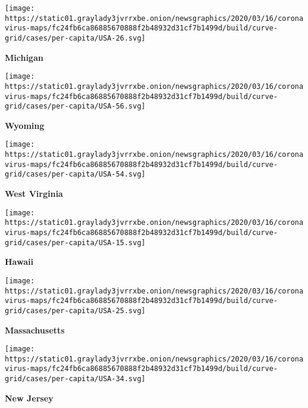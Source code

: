 \href{https://www.nytimes3xbfgragh.onion/interactive/2020/us/michigan-coronavirus-cases.html}{}

\texttt{[image: https://static01.graylady3jvrrxbe.onion/newsgraphics/2020/03/16/coronavirus-maps/fc24fb6ca86885670888f2b48932d31cf7b1499d/build/curve-grid/cases/per-capita/USA-26.svg]}

\textbf{Michigan}

\href{https://www.nytimes3xbfgragh.onion/interactive/2020/us/wyoming-coronavirus-cases.html}{}

\texttt{[image: https://static01.graylady3jvrrxbe.onion/newsgraphics/2020/03/16/coronavirus-maps/fc24fb6ca86885670888f2b48932d31cf7b1499d/build/curve-grid/cases/per-capita/USA-56.svg]}

\textbf{Wyoming}

\href{https://www.nytimes3xbfgragh.onion/interactive/2020/us/west-virginia-coronavirus-cases.html}{}

\texttt{[image: https://static01.graylady3jvrrxbe.onion/newsgraphics/2020/03/16/coronavirus-maps/fc24fb6ca86885670888f2b48932d31cf7b1499d/build/curve-grid/cases/per-capita/USA-54.svg]}

\textbf{West Virginia}

\href{https://www.nytimes3xbfgragh.onion/interactive/2020/us/hawaii-coronavirus-cases.html}{}

\texttt{[image: https://static01.graylady3jvrrxbe.onion/newsgraphics/2020/03/16/coronavirus-maps/fc24fb6ca86885670888f2b48932d31cf7b1499d/build/curve-grid/cases/per-capita/USA-15.svg]}

\textbf{Hawaii}

\href{https://www.nytimes3xbfgragh.onion/interactive/2020/us/massachusetts-coronavirus-cases.html}{}

\texttt{[image: https://static01.graylady3jvrrxbe.onion/newsgraphics/2020/03/16/coronavirus-maps/fc24fb6ca86885670888f2b48932d31cf7b1499d/build/curve-grid/cases/per-capita/USA-25.svg]}

\textbf{Massachusetts}

\href{https://www.nytimes3xbfgragh.onion/interactive/2020/us/new-jersey-coronavirus-cases.html}{}

\texttt{[image: https://static01.graylady3jvrrxbe.onion/newsgraphics/2020/03/16/coronavirus-maps/fc24fb6ca86885670888f2b48932d31cf7b1499d/build/curve-grid/cases/per-capita/USA-34.svg]}

\textbf{New Jersey}

\href{https://www.nytimes3xbfgragh.onion/interactive/2020/us/new-hampshire-coronavirus-cases.html}{}

